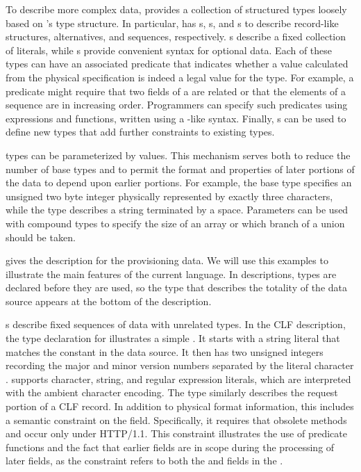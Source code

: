 \documentclass[11pt]{article}
\begin{document}
To describe more complex data, \pads{} provides a collection of 
structured types loosely based on \C{}'s type structure.
In particular, \pads{} has 
s, s, and s to describe
record-like structures, alternatives, and sequences, respectively.
s describe a fixed collection of literals, while s 
provide convenient syntax for optional data.
Each of these
types can have an associated predicate that indicates whether a
value calculated from the physical specification is indeed a legal
value for the type.  For example, a predicate might require that two
fields of a  are related or that the elements
of a sequence are in increasing order.  Programmers can specify such
predicates using \pads{} expressions and functions, 
written using a \C{}-like syntax.
Finally, \pads{} s can be used
to define new types that add further constraints to existing types.

\pads{} types can be parameterized by values.
This mechanism
serves both to reduce the number of base types and to permit the
format and properties of later portions of the data to depend upon earlier portions.
For example, 
the base type  specifies an unsigned two byte integer
physically represented by exactly three characters, while the type
describes a string terminated by a space.  Parameters can be 
used with compound types to specify the size of an array or which
branch of a union should be taken.


 gives the \pads{} description for the \dibbler{} 
provisioning data.  We will use this examples to illustrate the main 
features of the current
\pads{} language.  In \pads{} descriptions, types are declared before they are used, 
so the type that describes the totality of the data source appears at the bottom of 
the description.

s describe fixed sequences of data with unrelated types.
In the CLF description, the type declaration for
 illustrates a simple . It starts with a 
string literal that matches the constant  in the data source.  It 
then has two unsigned integers recording the major and minor version numbers
separated by the literal character .  \pads{} supports character, string,
and regular expression literals, which are interpreted with the ambient character 
encoding. The type  
similarly describes the request portion of a CLF record.  In addition
to physical format information, this  includes a semantic constraint
on the  field.  Specifically, it requires that obsolete methods
 and  occur only under HTTP/1.1.  This constraint illustrates
the use of predicate functions and the fact 
that earlier fields are in scope during the processing of later fields, as the 
constraint
refers to both the  and  fields in the .
\end{document}
